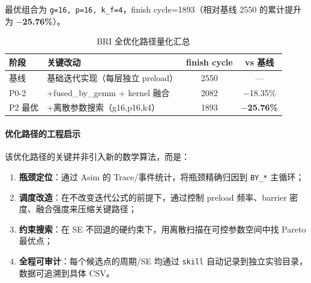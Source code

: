 \documentclass{CjC}
\begin{document}
    最优组合为 \texttt{g=16, p=16, k\_f=4}，finish cycle=1893（相对基线 2550 的累计提升为
    \textbf{$-$25.76\%}）。

    \begin{table}[H]
        \centering
        \caption{BRI 全优化路径量化汇总}
        \begin{tabular}{p{2.2cm} p{6.8cm} c c}
            \toprule \textbf{阶段} & \textbf{关键改动}                & \textbf{finish cycle} & \textbf{vs 基线}      \\
            \midrule 基线          & 基础迭代实现（每层独立 preload）         & 2550                  & —                   \\
            P0-2                 & +fused\_by\_gemm + kernel 融合 & 2082                  & $-$18.35\%          \\
            P2 最优                & +离散参数搜索（g16,p16,k4）          & 1893                  & \textbf{$-$25.76\%} \\
            \bottomrule
        \end{tabular}
    \end{table}

    \paragraph{优化路径的工程启示}

    该优化路径的关键并非引入新的数学算法，而是：
    \begin{enumerate}
        \item \textbf{瓶颈定位}：通过 Asim 的 Trace/事件统计，将瓶颈精确归因到 \texttt{BY\_*}
            主循环；

        \item \textbf{调度改造}：在不改变迭代公式的前提下，通过控制 preload 频率、barrier
            密度、融合强度来压缩关键路径；

        \item \textbf{约束搜索}：在 SE 不回退的硬约束下，用离散扫描在可控参数空间中找
            Pareto 最优点；

        \item \textbf{全程可审计}：每个候选点的周期/SE 均通过 \texttt{skill}
            自动记录到独立实验目录，数据可追溯到具体 CSV。
    \end{enumerate}
\end{document}
